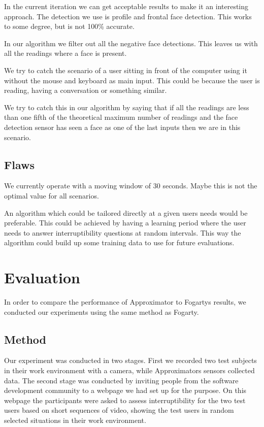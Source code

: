 \documentclass{sigchi}
\begin{document}
In the current iteration we can get acceptable results to make it an interesting approach.
The detection we use is profile and frontal face detection.
This works to some degree, but is not 100\% accurate.

In our algorithm we filter out all the negative face detections.
This leaves us with all the readings where a face is present.

We try to catch the scenario of a user sitting in front of the computer using it without the mouse and keyboard as main input.
This could be because the user is reading, having a conversation or something similar.

We try to catch this in our algorithm by saying that if all the readings are less than one fifth of the theoretical maximum number of readings and the face detection sensor has seen a face as one of the last inputs then we are in this scenario.

\subsection{Flaws}
We currently operate with a moving window of 30 seconds.
Maybe this is not the optimal value for all scenarios.

An algorithm which could be tailored directly at a given users needs would be preferable.
This could be achieved by having a learning period where the user needs to answer interruptibility questions at random intervals.
This way the algorithm could build up some training data to use for future evaluations.

\section{Evaluation}
In order to compare the performance of Approximator to Fogartys results, we conducted our experiments using the same method as Fogarty.

\subsection{Method}
Our experiment was conducted in two stages.
First we recorded two test subjects in their work environment with a camera, while Approximators sensors collected data.
The second stage was conducted by inviting people from the software development community to a webpage we had set up for the purpose.
On this webpage the participants were asked to assess interruptibility for the two test users based on short sequences of video, showing the test users in random selected situations in their work environment.
\end{document}
